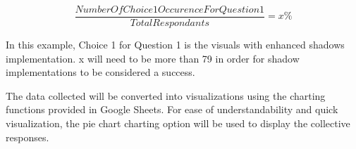 \documentclass[10pt,journal,compsoc,draftclsnofoot]{IEEEtran}
\begin{document}
\begin{flushleft}
\begin{equation}
\frac{Number Of Choice 1 Occurence For Question 1}{Total Respondants} = x\%
\end{equation}

\vspace{3mm}
In this example, Choice 1 for Question 1 is the visuals with enhanced shadows implementation. 
x will need to be more than 79 in order for shadow implementations to be considered a success.

The data collected will be converted into visualizations using the charting functions provided in Google Sheets. 
For ease of understandability and quick visualization, the pie chart charting option will be used to display the collective responses. 

\end{flushleft}
\end{document}

